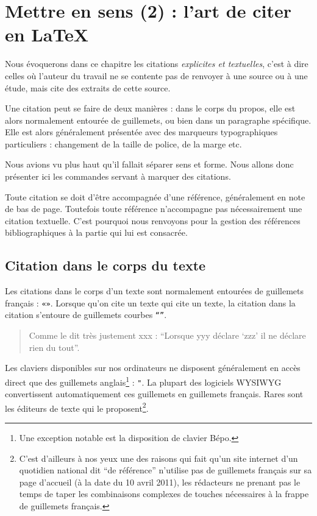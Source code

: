 \chapter{Mettre en sens (2) : l'art de citer en LaTeX}\label{citertexte}

\begin{intro}
Nous évoquerons dans ce chapitre les citations \emph{explicites et textuelles}, c'est à dire celles où l'auteur du travail ne se contente pas de renvoyer à une source ou à une étude, mais cite des extraits de cette source.

Une citation peut se faire de deux manières : dans le corps du propos, elle est alors normalement entourée de guillemets, ou bien dans un paragraphe spécifique. Elle est alors généralement présentée avec des marqueurs typographiques particuliers : changement de la taille de police, de la marge etc.

Nous avions vu plus haut qu'il fallait séparer sens et forme. Nous allons donc présenter ici les commandes servant à marquer des citations.

\end{intro}
\begin{attention}
Toute citation se doit d'être accompagnée d'une référence, généralement en note de bas de page. Toutefois toute référence n'accompagne pas nécessairement une citation textuelle. C'est pourquoi nous renvoyons pour la gestion des références bibliographiques à la partie qui lui est consacrée.

\end{attention}

\section{Citation dans le corps du texte}\label{guillemets}

Les citations dans le corps d'un texte sont normalement entourées de guillemets français : \verb|«»|. Lorsque qu'on cite un texte qui cite un texte, la citation dans la citation s'entoure de guillemets courbes \verb|“”|. 

\begin{quotation}
    Comme le dit très justement xxx : \enquote{Lorsque yyy déclare \enquote{zzz} il ne déclare rien du tout}.
\end{quotation}

Les claviers disponibles sur nos ordinateurs ne disposent généralement en accès direct que des guillemets anglais\footnote{Une exception notable est la disposition de clavier Bépo.} : \verb|"|. 
La plupart des logiciels WYSIWYG convertissent automatiquement ces guillemets en guillemets français. Rares sont les éditeurs de texte qui le proposent\footnote{C'est d'ailleurs à nos yeux une des raisons qui fait qu'un site internet d'un quotidien national dit \enquote{de référence} n'utilise pas de guillemets français sur sa page d'accueil (à la date du 10 avril 2011), les rédacteurs ne prenant pas le temps de taper les combinaisons complexes de touches nécessaires à la frappe de guillemets français.}. 

